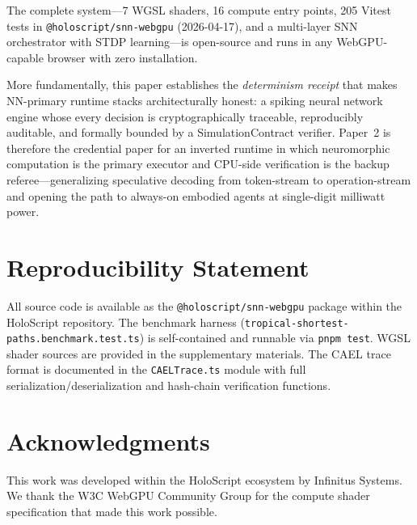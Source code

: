 \documentclass[10pt]{article}
\newcommand{\cael}{\textsc{CAEL}}
\begin{document}
The complete system---7 WGSL shaders, 16 compute entry points, 205 Vitest tests
in \texttt{@holoscript/snn-webgpu} (2026-04-17), and a multi-layer SNN orchestrator with STDP
learning---is open-source and runs in any WebGPU-capable browser with zero
installation.

More fundamentally, this paper establishes the \emph{determinism receipt} that
makes NN-primary runtime stacks architecturally honest: a spiking neural network
engine whose every decision is cryptographically traceable, reproducibly
auditable, and formally bounded by a SimulationContract verifier.
Paper~2 is therefore the credential paper for an inverted runtime in which
neuromorphic computation is the primary executor and CPU-side verification is the
backup referee---generalizing speculative decoding from token-stream to
operation-stream and opening the path to always-on embodied agents at
single-digit milliwatt power.

\section*{Reproducibility Statement}

All source code is available as the \texttt{@holoscript/snn-webgpu} package
within the HoloScript repository.
The benchmark harness (\texttt{tropical-shortest-paths.benchmark.test.ts})
is self-contained and runnable via \texttt{pnpm test}.
WGSL shader sources are provided in the supplementary materials.
The \cael{} trace format is documented in the
\texttt{CAELTrace.ts} module with full serialization/deserialization
and hash-chain verification functions.

\section*{Acknowledgments}

This work was developed within the HoloScript ecosystem by Infinitus Systems.
We thank the W3C WebGPU Community Group for the compute shader specification
that made this work possible.


{\footnotesize
\setlength{\bibsep}{0pt}


}
\end{document}
